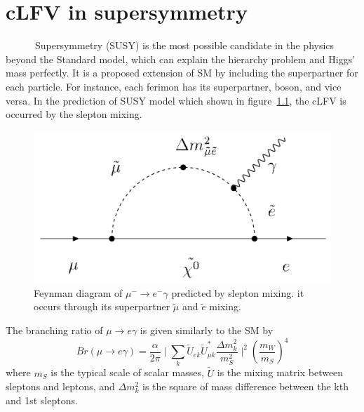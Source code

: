 \chapter{cLFV in supersymmetry}
~~~~~~Supersymmetry (SUSY) is the most possible candidate in the physics beyond the Standard model, which can explain the hierarchy problem and Higgs' mass perfectly.
It is a proposed extension of SM by including the superpartner for each particle.
For instance, each ferimon has its superpartner, boson, and vice versa.
In the prediction of SUSY model which shown in figure~\ref{susyfy}, the cLFV is occurred by the slepton mixing.
\begin{figure}[H]
 \centering
 \includegraphics[scale=0.3]{chapter1/fig/SUSYmue.pdf}
 \caption{Feynman diagram of $\mu^- \rightarrow e^-\gamma$ predicted by slepton mixing. it occurs through its superpartner $\tilde{\mu}$ and $\tilde{e}$ mixing.}
 \label{susyfy}
\end{figure}
The branching ratio of $\mu \rightarrow e\gamma$ is given similarly to the SM by~\cite{kuno2}
\begin{equation}
 Br(\mu \rightarrow e\gamma) = \frac{\alpha}{2\pi}\mid\sum_{k}\tilde{U}_{ek}\tilde{U}^*_{\mu k}\frac{\Delta m_k^2}{m_S^2}\mid^2(\frac{m_W}{m_S})^4
\end{equation}
where $m_S$ is the typical scale of scalar masses, $\tilde{U}$ is the mixing matrix between sleptons and leptons, and $\Delta m_k^2$ is the square of mass difference between the kth and 1st sleptons.

